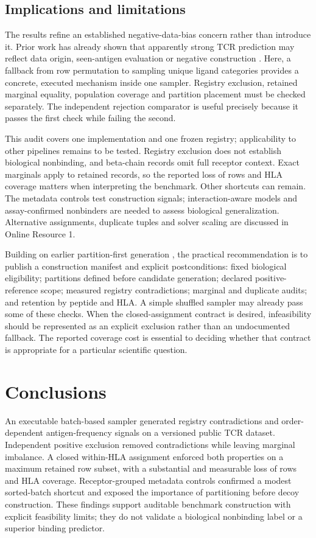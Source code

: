 \documentclass[pdflatex,sn-basic]{sn-jnl}
\begin{document}
\subsection{Implications and limitations}
The results refine an established negative-data-bias concern rather than introduce it. Prior work has already shown that apparently strong TCR prediction may reflect data origin, seen-antigen evaluation or negative construction \citep{Dens2023,Jiang2023,Lu2026,Castorina2025,Mi2026}. Here, a fallback from row permutation to sampling unique ligand categories provides a concrete, executed mechanism inside one sampler. Registry exclusion, retained marginal equality, population coverage and partition placement must be checked separately. The independent rejection comparator is useful precisely because it passes the first check while failing the second.

This audit covers one implementation and one frozen registry; applicability to other pipelines remains to be tested. Registry exclusion does not establish biological nonbinding, and beta-chain records omit full receptor context. Exact marginals apply to retained records, so the reported loss of rows and HLA coverage matters when interpreting the benchmark. Other shortcuts can remain. The metadata controls test construction signals; interaction-aware models and assay-confirmed nonbinders are needed to assess biological generalization. Alternative assignments, duplicate tuples and solver scaling are discussed in Online Resource 1.

Building on earlier partition-first generation \citep{Korpela2023}, the practical recommendation is to publish a construction manifest and explicit postconditions: fixed biological eligibility; partitions defined before candidate generation; declared positive-reference scope; measured registry contradictions; marginal and duplicate audits; and retention by peptide and HLA. A simple shuffled sampler may already pass some of these checks. When the closed-assignment contract is desired, infeasibility should be represented as an explicit exclusion rather than an undocumented fallback. The reported coverage cost is essential to deciding whether that contract is appropriate for a particular scientific question.

\section{Conclusions}
An executable batch-based sampler generated registry contradictions and order-dependent antigen-frequency signals on a versioned public TCR dataset. Independent positive exclusion removed contradictions while leaving marginal imbalance. A closed within-HLA assignment enforced both properties on a maximum retained row subset, with a substantial and measurable loss of rows and HLA coverage. Receptor-grouped metadata controls confirmed a modest sorted-batch shortcut and exposed the importance of partitioning before decoy construction. These findings support auditable benchmark construction with explicit feasibility limits; they do not validate a biological nonbinding label or a superior binding predictor.
\end{document}
